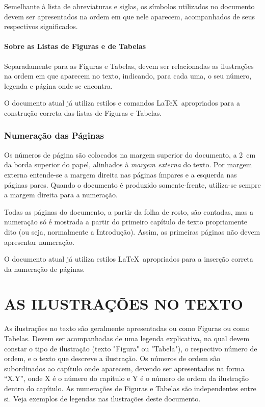 \documentclass[rel_mlp]{iiufrgs}
\begin{document}
Semelhante à lista de abreviaturas e siglas, os símbolos utilizados no documento devem ser apresentados na ordem em que nele aparecem, acompanhados de seus respectivos significados. 



\subsubsection{Sobre as Listas de Figuras e de Tabelas}

Separadamente para as Figuras e Tabelas, devem ser relacionadas as ilustrações na ordem em que aparecem no texto, indicando, para cada uma, o seu número, legenda e página onde se encontra.

O documento atual já utiliza estilos e comandos \LaTeX\ apropriados para a construção correta das listas de Figuras e Tabelas. 



\subsection{Numeração das Páginas}

Os números de página são colocados na margem superior do documento, a 2~cm da borda superior do papel, alinhados à {\it margem externa} do texto. Por margem externa entende-se a margem direita nas páginas ímpares e a esquerda nas páginas pares. Quando o documento é produzido somente-frente, utiliza-se sempre a margem direita para a numeração. 

Todas as páginas do documento, a partir da folha de rosto, são contadas, mas a numeração só é mostrada a partir do primeiro capítulo de texto propriamente dito (ou seja, normalmente a Introdução). Assim, as primeiras páginas não devem apresentar numeração.

O documento atual já utiliza estilos \LaTeX\ apropriados para a inserção correta da numeração de páginas. 



%
\chapter{AS ILUSTRAÇÕES NO TEXTO}

As ilustrações no texto são geralmente apresentadas ou como Figuras ou como Tabelas. Devem ser acompanhadas de uma legenda explicativa, na qual devem constar o tipo de ilustração (texto "Figura" ou "Tabela"), o respectivo número de ordem, e o texto que descreve a ilustração. Os números de ordem são subordinados ao capítulo onde aparecem, devendo ser apresentados na forma ``X.Y'', onde X é o número do capítulo e Y é o número de ordem da ilustração dentro do capítulo. As numerações de Figuras e Tabelas são independentes entre si. Veja exemplos de legendas nas ilustrações deste documento. 
\end{document}
